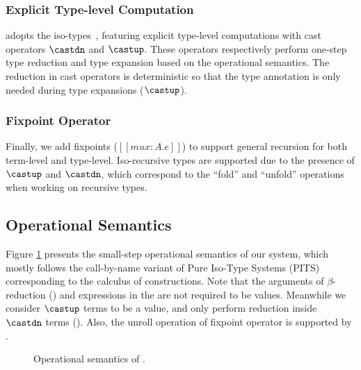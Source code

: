 \subsubsection{Explicit Type-level Computation}
\label{sec:cast}
\System adopts the iso-types~\cite{yang2016unified}, featuring explicit type-level
computations with cast operators $\castdn$ and $\castup$. These operators
respectively perform one-step
type reduction and type expansion based on the operational semantics.
The reduction in cast operators is deterministic so that the type annotation is
only needed during type expansions ($\castup$).

\subsubsection{Fixpoint Operator}

Finally, we add fixpoints ($[[mu x : A. e]]$)
to support general recursion for both term-level
and type-level. Iso-recursive types are supported due to the presence of $\castup$
and $\castdn$, which correspond to the ``fold'' and ``unfold'' operations when
working on recursive types.

\subsection{Operational Semantics}


Figure \ref{fig:semantics} presents the small-step operational semantics of our system,
which mostly follows the call-by-name variant of Pure Iso-Type Systems (PITS)
\cite{yang2019pure} corresponding to the calculus of constructions.
Note that the arguments of $\beta$-reduction () and expressions in
the  are not required to be values.
Meanwhile we consider $\castup$ terms to be a value,
and only perform reduction inside $\castdn$ terms (). Also, the unroll
operation of fixpoint operator is supported by .

\begin{figure}[t]
    \centering


    \caption{Operational semantics of \name.}
    \label{fig:semantics}
\end{figure}

